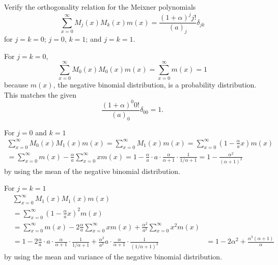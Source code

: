 \documentclass[12pt]{article}
\begin{document}
\begin{exercise}
    Verify the orthogonality relation for the Meixner polynomials
    \[
        \sum\limits_{x=0}^{\infty} M_j(x) M_k(x) m(x) = \frac{(1+\alpha)^j
        j!}{(a)_j} \delta_{jk}
    \] for \( j = k = 0 \); \( j = 0 \), \( k=1 \); and \( j = k = 1 \).
\end{exercise}
\begin{solution}
    For \( j = k = 0 \),
    \[
        \sum\limits_{x=0}^{\infty} M_0(x) M_0(x) m(x) = \sum\limits_{x=0}^
        {\infty} m(x) = 1
    \] because \( m(x) \), the negative binomial distribution, is a
    probability distribution.  This matches the given
    \[
        \frac{(1+\alpha)^0 0!}{(a)_0} \delta_{00} = 1.
    \]

    For \( j = 0 \) and \( k = 1 \)
    \begin{multline*}
        \sum\limits_{x=0}^{\infty} M_0(x) M_1(x) m(x) = \sum\limits_{x=0}^
        {\infty} M_1(x) m(x) = \sum\limits_{x=0}^{\infty} \left( 1 -
        \frac{\alpha}{a}x \right) m(x)\\
        = \sum\limits_{x=0}^{\infty} m(x) - \frac{\alpha}{a} \sum\limits_
        {x=0}^{\infty} x m(x) = 1 - \frac{\alpha}{a} \cdot a \cdot \frac
        {\alpha}{\alpha+1} \cdot \frac{1}{1/\alpha+1} = 1 - \frac{\alpha^2}
        {(\alpha+1)^2}
    \end{multline*}
    by using the mean of the negative binomial distribution.

    For \( j = k = 1 \)
    \begin{align*}
        &\sum\limits_{x=0}^{\infty} M_1(x) M_1(x) m(x) \\
        & = \sum\limits_{x=0}^{\infty} \left( 1 - \frac{\alpha}{a}x
        \right)^2 m(x)\\
        & = \sum\limits_{x=0}^{\infty} m(x) - 2\frac{\alpha}{a} \sum\limits_
        {x=0}^{\infty} x m(x) + \frac{\alpha^2}{a^2} \sum\limits_{x=0}^{\infty}
        x^2 m(x)\\
        & = 1 - 2\frac{\alpha}{a} \cdot a \cdot \frac{\alpha}{\alpha+1}
        \cdot \frac{1}{1/\alpha+1} + \frac{\alpha^2}{a^2} a \cdot \frac{\alpha}
        {\alpha+1} \cdot \frac{1}{(1/\alpha+1)^2} & = 1 - 2 \alpha^2 +
        \frac{\alpha^3(\alpha+1)}{\alpha}
    \end{align*}
    by using the mean and variance of the negative binomial
    distribution.

\end{solution}
\end{document}
